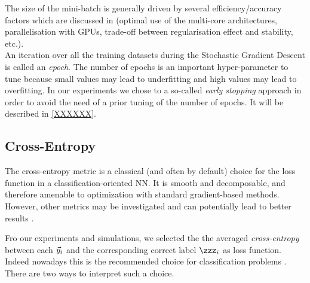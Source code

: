 The size of the mini-batch is generally
driven by several efficiency/accuracy factors which are \eg discussed in
\cite{GBC16} (\eg optimal use of the multi-core architectures, parallelisation
with GPUs, trade-off between regularisation effect and stability, etc.). \\

An iteration over all the training datasets during the Stochastic Gradient Descent is called an \emph{epoch}.
The number of epochs is an important hyper-parameter to tune because
small values may lead to underfitting and high values may lead to overfitting. In our experiments we chose to a so-called \emph{early stopping} approach in order to avoid the need of a prior tuning of the number of epochs. It will be described in \ref{XXXXXX}.\\

\subsection{Cross-Entropy}
The cross-entropy \cite{LCH05,Goodfellow-et-al-2016}
metric is a classical (and often by default) choice for the loss function in a classification-oriented NN. It is smooth and
decomposable, and therefore amenable to optimization with standard
gradient-based methods. However, other metrics may be investigated and can
potentially lead to better results \cite{MHK10,SSZU15}. 


Fro our experiments and simulations, we selected the the averaged \emph{cross-entropy} between each $\vec{y}_i$ and the corresponding correct label $\zzz_i$ as loss function. Indeed nowadays this is the recommended choice for classification problems \cite{Goodfellow-et-al-2016}.  There are two ways to interpret such a choice. 

